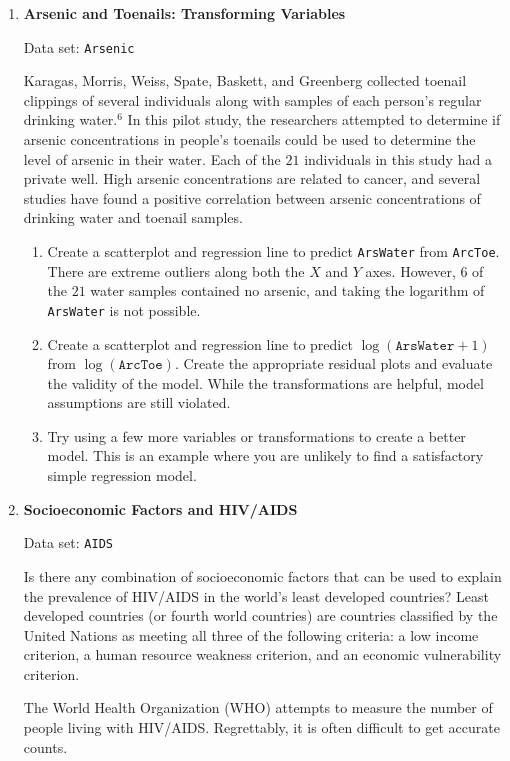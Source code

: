 \documentclass[
]{book}
\begin{document}
\begin{enumerate}
  \item \textbf{Arsenic and Toenails: Transforming Variables}

Data set: \texttt{Arsenic}

Karagas, Morris, Weiss, Spate, Baskett, and Greenberg collected toenail clippings of several individuals along with samples of each person’s regular drinking water.$^6$ In this pilot study, the researchers attempted to determine if arsenic concentrations in people’s toenails could be used to determine the level of arsenic in their water. Each of the $21$ individuals in this study had a private well. High arsenic concentrations are related to cancer, and several studies have found a positive correlation between arsenic concentrations of drinking water and toenail samples.

  \begin{enumerate}
      \item Create a scatterplot and regression line to predict \texttt{ArsWater} from \texttt{ArcToe}. There are extreme outliers along both the $X$ and $Y$ axes. However, $6$ of the $21$ water samples contained no arsenic, and taking the logarithm of \texttt{ArsWater} is not possible.
      \item Create a scatterplot and regression line to predict $\log(\texttt{ArsWater} + 1)$ from $\log(\texttt{ArcToe})$. Create the appropriate residual plots and evaluate the validity of the model. While the transformations are helpful, model assumptions are still violated.
      \item Try using a few more variables or transformations to create a better model. This is an example where you are unlikely to find a satisfactory simple regression model.
    \end{enumerate}

  \item \textbf{Socioeconomic Factors and HIV/AIDS}

Data set: \texttt{AIDS}

Is there any combination of socioeconomic factors that can be used to explain the prevalence of HIV/AIDS in the world’s least developed countries? Least developed countries (or fourth world countries) are countries classified by the United Nations as meeting all three of the following criteria: a low income criterion, a human resource weakness criterion, and an economic vulnerability criterion.

The World Health Organization (WHO) attempts to measure the number of people living with HIV/AIDS. Regrettably, it is often difficult to get accurate counts.


\end{enumerate}
\end{document}
